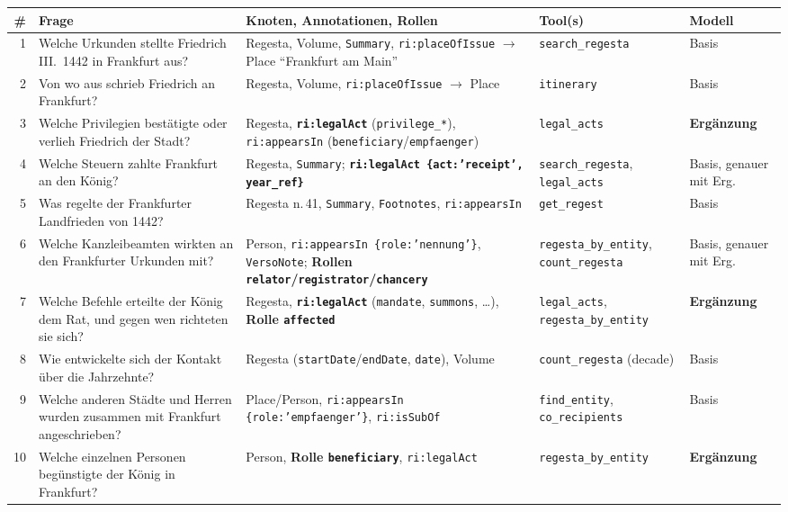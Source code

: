 \documentclass[10pt,a4paper]{article}
\newcommand{\code}[1]{\texttt{\small #1}}
\newcommand{\erg}{\textbf{Ergänzung}}
\begin{document}
\begin{small}
\begin{tabularx}{\textwidth}{@{}r p{4.2cm} L p{2.9cm} p{1.6cm}@{}}
\toprule
\textbf{\#} & \textbf{Frage} & \textbf{Knoten, Annotationen, Rollen} & \textbf{Tool(s)} & \textbf{Modell}\\ & Welche Urkunden stellte Friedrich III.\ 1442 in Frankfurt aus? & Regesta, Volume, \code{Summary}, \code{ri:placeOfIssue} $\to$ Place \enquote{Frankfurt am Main} & \code{search\_regesta} & Basis\\
2 & Von wo aus schrieb Friedrich an Frankfurt? & Regesta, Volume, \code{ri:placeOfIssue} $\to$ Place & \code{itinerary} & Basis\\
3 & Welche Privilegien bestätigte oder verlieh Friedrich der Stadt? & Regesta, \textbf{\code{ri:legalAct}} (\code{privilege\_*}), \code{ri:appearsIn} (\code{beneficiary}/\code{empfaenger}) & \code{legal\_acts} & \erg\\
4 & Welche Steuern zahlte Frankfurt an den König? & Regesta, \code{Summary}; \textbf{\code{ri:legalAct \{act:'receipt', year\_ref\}}} & \code{search\_regesta}, \code{legal\_acts} & Basis, genauer mit Erg.\\
5 & Was regelte der Frankfurter Landfrieden von 1442? & Regesta n.\,41, \code{Summary}, \code{Footnotes}, \code{ri:appearsIn} & \code{get\_regest} & Basis\\
6 & Welche Kanzleibeamten wirkten an den Frankfurter Urkunden mit? & Person, \code{ri:appearsIn \{role:'nennung'\}}, \code{VersoNote}; \textbf{Rollen \code{relator}/\code{registrator}/\code{chancery}} & \code{regesta\_by\_entity}, \code{count\_regesta} & Basis, genauer mit Erg.\\
7 & Welche Befehle erteilte der König dem Rat, und gegen wen richteten sie sich? & Regesta, \textbf{\code{ri:legalAct}} (\code{mandate}, \code{summons}, \dots), \textbf{Rolle \code{affected}} & \code{legal\_acts}, \code{regesta\_by\_entity} & \erg\\
8 & Wie entwickelte sich der Kontakt über die Jahrzehnte? & Regesta (\code{startDate}/\code{endDate}, \code{date}), Volume & \code{count\_regesta} (decade) & Basis\\
9 & Welche anderen Städte und Herren wurden zusammen mit Frankfurt angeschrieben? & Place/Person, \code{ri:appearsIn \{role:'empfaenger'\}}, \code{ri:isSubOf} & \code{find\_entity}, \code{co\_recipients} & Basis\\
10 & Welche einzelnen Personen begünstigte der König in Frankfurt? & Person, \textbf{Rolle \code{beneficiary}}, \code{ri:legalAct} & \code{regesta\_by\_entity} & \erg\\
\bottomrule
\end{tabularx}
\end{small}
\end{document}
